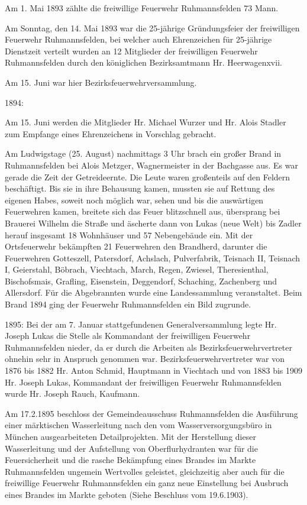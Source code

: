 \documentclass{book}
\begin{document}
Am 1. Mai 1893 zählte die freiwillige Feuerwehr Ruhmannsfelden 73 Mann.

Am Sonntag, den 14. Mai 1893 war die 25-jährige Gründungsfeier der freiwilligen
Feuerwehr Ruhmannsfelden, bei welcher auch Ehrenzeichen für 25-jährige
Dienstzeit verteilt wurden an 12 Mitglieder der freiwilligen Feuerwehr
Ruhmannsfelden durch den königlichen Bezirksamtmann Hr. Heerwagenxvii.

Am 15. Juni war hier Bezirksfeuerwehrversammlung.

1894:

Am 15. Juni werden die Mitglieder Hr. Michael Wurzer und Hr. Alois Stadler zum
Empfange eines Ehrenzeichens in Vorschlag gebracht.

Am Ludwigstage (25. August) nachmittags 3 Uhr brach ein großer Brand in
Ruhmannsfelden bei Alois Metzger, Wagnermeister in der Bachgasse aus. Es war
gerade die Zeit der Getreideernte. Die Leute waren großenteils auf den Feldern
beschäftigt. Bis sie in ihre Behausung kamen, mussten sie auf Rettung des
eigenen Habes, soweit noch möglich war, sehen und bis die auswärtigen
Feuerwehren kamen, breitete sich das Feuer blitzschnell aus, übersprang bei
Brauerei Wilhelm die Straße und äscherte dann von Lukas (neue Welt) bis Zadler
herauf insgesamt 18 Wohnhäuser und 57 Nebengebäude ein. Mit der Ortsfeuerwehr
bekämpften 21 Feuerwehren den Brandherd, darunter die Feuerwehren Gotteszell,
Patersdorf, Achslach, Pulverfabrik, Teisnach II, Teisnach I, Geierstahl,
Böbrach, Viechtach, March, Regen, Zwiesel, Theresienthal, Bischofsmais,
Grafling, Eisenstein, Deggendorf, Schaching, Zachenberg und Allersdorf. Für die
Abgebrannten wurde eine Landessammlung veranstaltet. Beim Brand 1894 ging der
Feuerwehr Ruhmannsfelden ein Bild zugrunde.

1895:   Bei der am 7. Januar stattgefundenen Generalversammlung legte Hr. Joseph
Lukas die Stelle als Kommandant der freiwilligen Feuerwehr Ruhmannsfelden
nieder, da er durch die Arbeiten als Bezirksfeuerwehrvertreter ohnehin sehr in
Anspruch genommen war. Bezirksfeuerwehrvertreter war von 1876 bis 1882 Hr. Anton
Schmid, Hauptmann in Viechtach und von 1883 bis 1909 Hr. Joseph Lukas,
Kommandant der freiwilligen Feuerwehr Ruhmannsfelden wurde Hr. Joseph Rauch,
Kaufmann.

Am 17.2.1895 beschloss der Gemeindeausschuss Ruhmannsfelden die Ausführung einer
märktischen Wasserleitung nach den vom Wasserversorgungsbüro in München
ausgearbeiteten Detailprojekten. Mit der Herstellung dieser Wasserleitung und
der Aufstellung von Oberflurhydranten war für die Feuersicherheit und die rasche
Bekämpfung eines Brandes im Markte Ruhmannsfelden ungemein Wertvolles geleistet,
gleichzeitig aber auch für die freiwillige Feuerwehr Ruhmannsfelden ein ganz
neue Einstellung bei Ausbruch eines Brandes im Markte geboten (Siehe Beschluss
vom 19.6.1903).
\end{document}
